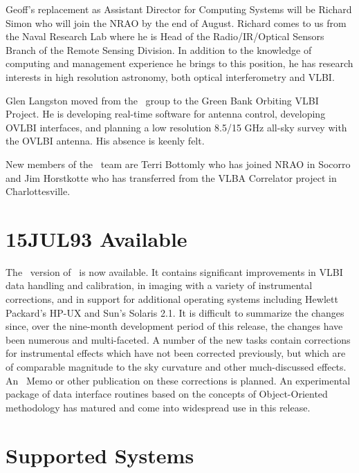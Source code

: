 Geoff's replacement as Assistant Director for Computing Systems will
be Richard Simon who will join the NRAO by the end of August.  Richard
comes to us from the Naval Research Lab where he is Head of the
Radio/IR/Optical Sensors Branch of the Remote Sensing Division. In
addition to the knowledge of computing and management experience he
brings to this position, he has research interests in high resolution
astronomy, both optical interferometry and \hbox{{VLBI}}.

Glen Langston moved from the \AIPS\ group to the Green Bank Orbiting
VLBI Project.  He is developing real-time software for antenna
control, developing OVLBI interfaces,  and planning a low resolution
8.5/15 GHz all-sky survey with the OVLBI antenna.  His absence is
keenly felt.

New members of the \AIPTOO\ team are Terri Bottomly who has joined
NRAO in Socorro and Jim Horstkotte who has transferred from the VLBA
Correlator project in Charlottesville.

\section{15JUL93 Available}
\vskip -8pt

The \RELEASENAME\ version of \AIPS\ is now available.  It contains
significant improvements in VLBI data handling and calibration, in
imaging with a variety of instrumental corrections, and in support for
additional operating systems including Hewlett Packard's HP-UX and
Sun's Solaris 2.1.  It is difficult to summarize the changes since,
over the nine-month development period of this release, the changes
have been numerous and multi-faceted.  A number of the new tasks
contain corrections for instrumental effects which have not been
corrected previously, but which are of comparable magnitude to the sky
curvature and other much-discussed effects.  An \AIPS\ Memo or other
publication on these corrections is planned.  An experimental package
of data interface routines based on the concepts of Object-Oriented
methodology has matured and come into widespread use in this release.

\clearpage

\section{Supported Systems}

